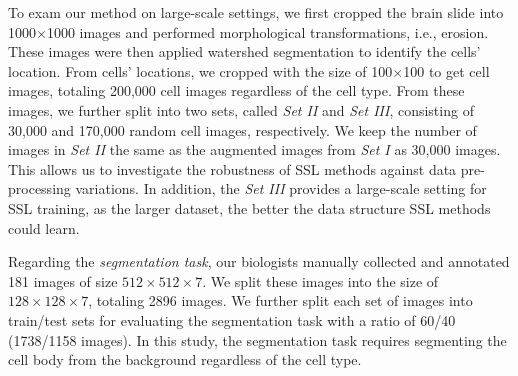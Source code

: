 \documentclass[10pt,twocolumn,letterpaper]{article}
\begin{document}
To exam our method on large-scale settings, we first cropped the brain slide into 1000$\times$1000 images and performed morphological transformations, i.e., erosion. These images were then applied watershed segmentation to identify the cells' location. From cells' locations, we cropped with the size of 100$\times$100 to get cell images, totaling 200,000 cell images regardless of the cell type. From these images, we further split into two sets, called \textit{Set II} and \textit{Set III}, consisting of 30,000 and 170,000 random cell images, respectively. We keep the number of images in \textit{Set II} the same as the augmented images from \textit{Set I} as 30,000 images. This allows us to investigate the robustness of SSL methods against data pre-processing variations. In addition, the \textit{Set III} provides a large-scale setting for SSL training, as the larger dataset, the better the data structure SSL methods could learn.



Regarding the {\textit{segmentation task}}, our biologists manually collected and annotated 181 images of size $512\times512\times7$. We split these images into the size of $128\times128\times7$, totaling 2896 images. We further split each set of images into train/test sets for evaluating the segmentation task with a ratio of 60/40 (1738/1158 images). In this study, the segmentation task requires segmenting the cell body from the background regardless of the cell type.
\end{document}
